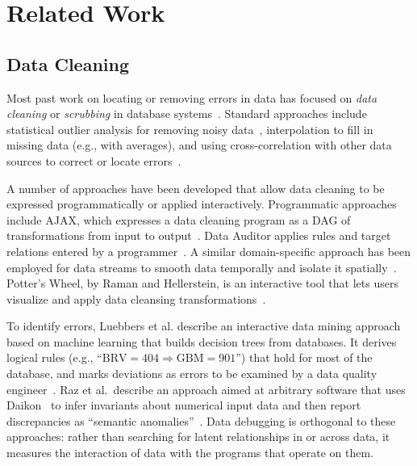 \section{Related Work}


\subsection*{Data Cleaning}

Most past work on locating or removing errors in data has focused
on \emph{data cleaning} or \emph{scrubbing} in database
systems~\cite{DBLP:journals/debu/RahmD00,han2006data}. Standard
approaches include statistical outlier analysis for removing noisy
data~\cite{1583581}, interpolation to fill in missing data (e.g., with
averages), and using cross-correlation with other data sources to correct or
locate errors~\cite{Hernandez:1995:MPL:223784.223807}.




A number of approaches have been developed that allow data cleaning to
be expressed programmatically or applied interactively. Programmatic
approaches include AJAX, which expresses a data cleaning program as a
DAG of transformations from input to
output~\cite{Galhardas:2000:AED:342009.336568}. Data Auditor applies
rules and target relations entered by a
programmer~\cite{Golab:2010:DAE:1920841.1921060}. A similar
domain-specific approach has been employed for data streams to smooth
data temporally and isolate it spatially~\cite{1617508}. Potter's
Wheel, by Raman and Hellerstein, is an interactive tool that lets
users visualize and apply data cleansing
transformations~\cite{Raman:2001:PWI:645927.672045}.

To identify errors, Luebbers et al. describe an interactive data
mining approach based on machine learning that builds decision trees
from databases. It derives logical rules (e.g., ``$\mbox{BRV} =
404 \Rightarrow \mbox{GBM} = 901$'') that hold for most of the
database, and marks deviations as errors to be examined by a data
quality engineer~\cite{Luebbers:2003:SDD:1315451.1315499}. Raz et al.\
describe an approach aimed at arbitrary software that uses
Daikon~\cite{ernst2007daikon} to infer invariants about numerical
input data and then report discrepancies as ``semantic
anomalies''~\cite{Raz:2002:SAD:581339.581378}.  Data debugging is
orthogonal to these approaches: rather than searching for latent
relationships in or across data, it measures the interaction of data with
the programs that operate on them.
 

